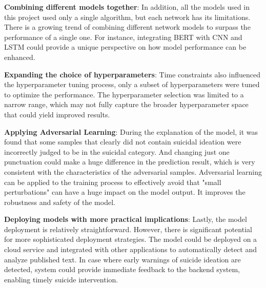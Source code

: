 \documentclass[ %
                    author={Bocheng Wang},
                supervisor={Dr. Qiang Liu},
                    degree={MSc},
                     title={A Research on Identification of Suicide Ideation in Texts with Multiple Models},
                      type={},
                      year={2024}]{dissertation}
\begin{document}
\textbf{Combining different models together}: In addition, all the models used in this project used only a single algorithm, but each network has its limitations. There is a growing trend of combining different network models to surpass the performance of a single one. For instance, integrating BERT with CNN and LSTM could provide a unique perspective on how model performance can be enhanced.

\textbf{Expanding the choice of hyperparameters}: Time constraints also influenced the hyperparameter tuning process, only a subset of hyperparameters were tuned to optimize the performance. The hyperparameter selection was limited to a narrow range, which may not fully capture the broader hyperparameter space that could yield improved results.

\textbf{Applying Adversarial Learning}: During the explanation of the model, it was found that some samples that clearly did not contain suicidal ideation were incorrectly judged to be in the suicidal category. And changing just one punctuation could make a huge difference in the prediction result, which is very consistent with the characteristics of the adversarial samples. Adversarial learning\cite{2013Intriguing} can be applied to the training process to effectively avoid that "small perturbations" can have a huge impact on the model output. It improves the robustness and safety of the model.

\textbf{Deploying models with more practical implications}: Lastly, the model deployment is relatively straightforward. However, there is significant potential for more sophisticated deployment strategies. The model could be deployed on a cloud service and integrated with other applications to automatically detect and analyze published text. In case where early warnings of suicide ideation are detected, system could provide immediate feedback to the backend system, enabling timely suicide intervention.


%
%
\end{document}
